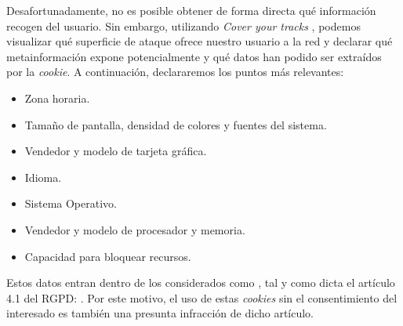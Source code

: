 Desafortunadamente, no es posible obtener de forma directa qué información recogen del usuario. Sin embargo, utilizando \textit{Cover your tracks} \cite{coveryourtracks}, podemos visualizar qué superficie de ataque ofrece nuestro usuario a la red y declarar qué metainformación expone potencialmente y qué datos han podido ser extraídos por la \textit{cookie}. A continuación, declararemos los puntos más relevantes:
\begin{itemize}
    \item Zona horaria.
    \item Tamaño de pantalla, densidad de colores y fuentes del sistema.
    \item Vendedor y modelo de tarjeta gráfica.
    \item Idioma.
    \item Sistema Operativo.
    \item Vendedor y modelo de procesador y memoria.
    \item Capacidad para bloquear recursos.
\end{itemize}

Estos datos entran dentro de los considerados como , tal y como dicta el artículo 4.1 del RGPD: . Por este motivo, el uso de estas \textit{cookies} sin el consentimiento del interesado es también una presunta infracción de dicho artículo.